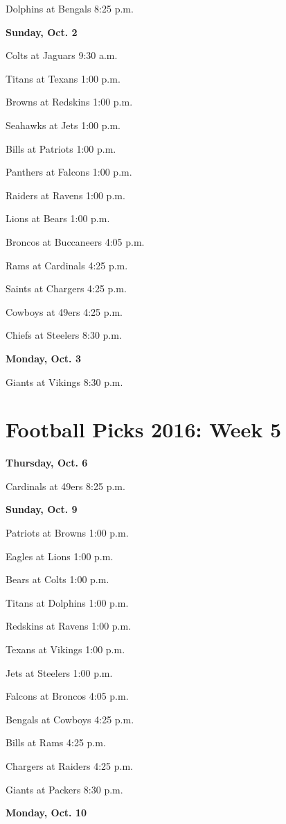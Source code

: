 \documentclass[12pt, letterpaper]{article}
\begin{document}
Dolphins at Bengals 8:25 p.m.\par
\noindent \Large \textbf{Sunday, Oct. 2} \par
Colts at Jaguars 9:30 a.m.\par
Titans at Texans 1:00 p.m.\par
Browns at Redskins 1:00 p.m.\par
Seahawks at Jets 1:00 p.m.\par
Bills at Patriots 1:00 p.m.\par
Panthers at Falcons 1:00 p.m.\par
Raiders at Ravens 1:00 p.m.\par
Lions at Bears 1:00 p.m.\par
Broncos at Buccaneers 4:05 p.m.\par
Rams at Cardinals 4:25 p.m.\par
Saints at Chargers 4:25 p.m.\par
Cowboys at 49ers 4:25 p.m.\par
Chiefs at Steelers 8:30 p.m.\par
\noindent \Large \textbf{Monday, Oct. 3} \par
Giants at Vikings 8:30 p.m.\par
\newpage \section*{\Huge Football Picks 2016: Week 5}
\noindent \Large \textbf{Thursday, Oct. 6} \par
Cardinals at 49ers 8:25 p.m.\par
\noindent \Large \textbf{Sunday, Oct. 9} \par
Patriots at Browns 1:00 p.m.\par
Eagles at Lions 1:00 p.m.\par
Bears at Colts 1:00 p.m.\par
Titans at Dolphins 1:00 p.m.\par
Redskins at Ravens 1:00 p.m.\par
Texans at Vikings 1:00 p.m.\par
Jets at Steelers 1:00 p.m.\par
Falcons at Broncos 4:05 p.m.\par
Bengals at Cowboys 4:25 p.m.\par
Bills at Rams 4:25 p.m.\par
Chargers at Raiders 4:25 p.m.\par
Giants at Packers 8:30 p.m.\par
\noindent \Large \textbf{Monday, Oct. 10} \par
\end{document}
